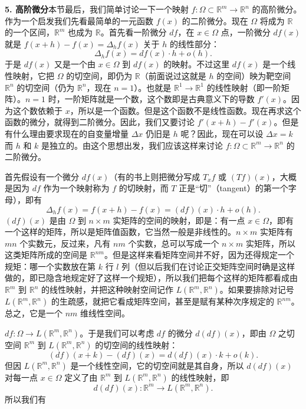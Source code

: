 \noindent\textbf{5. 高阶微分}\quad 本节最后，我们简单讨论一下一个映射 $f:\Omega\subset\mathbb R^m\to\mathbb R^n$ 的高阶微分。作为一个启发我们先看最简单的一元函数 $f(x)$ 的二阶微分。现在 $\Omega$ 将成为 $\mathbb R$ 的一个区间，$\mathbb R^m$ 也成为 $\mathbb R$。首先看一阶微分 $df$，在 $x\in\Omega$ 点，一阶微分 $df(x)$ 就是 $f(x+h)-f(x)=\Delta_hf(x)$ 关于 $h$ 的线性部分：
\[
 \Delta_hf(x)=df(x)\cdot h+o(h).
\]
于是 $df(x)$ 又是一个由 $x\in\Omega$ 到 $df(x)$ 的映射。不过这里 $df(x)$ 是一个线性映射，它把 $\Omega$ 的切空间，即仍为 $\mathbb R$（前面说过这就是 $h$ 的空间）映为靶空间 $\mathbb R^n$ 的切空间（仍为 $\mathbb R^n$，现在 $n=1$）。也就是 $\mathbb R^1\to\mathbb R^1$ 的线性映射（即一阶矩阵）。$n=1$ 时，一阶矩阵就是一个数，这个数即是古典意义下的导数 $f'(x)$。因为这个数依赖于 $x$，所以是一个函数。但是这个函数不是线性函数。现在再求这个函数的微分，就得到二阶微分。因此，我们又要讨论 $f'(x+h)-f'(x)$。但是有什么理由要求现在的自变量增量 $\Delta x$ 仍旧是 $h$ 呢？因此，现在可以设 $\Delta x=k$ 而 $h$ 和 $k$ 是独立的。由这个思想出发，我们应该这样来讨论 $f:\Omega\subset\mathbb R^m\to\mathbb R^n$ 的二阶微分。

首先假设有一个微分 $df(x)$（有的书上则把微分写成 $T_xf$ 或 $(Tf)(x)$，大概是因为 $df$ 作为一个映射称为 $f$ 的切映射，而 $T$ 正是“切”（tangent）的第一个字母），即有
\[
 \Delta_hf(x)=f(x+h)-f(x)=(df)(x)\cdot h+o(h).
\]
$(df)(x)$ 是由 $\Omega$ 到 $n\times m$ 实矩阵的空间的映射，即是：有一点 $x\in\Omega$，即有一个这样的矩阵，所以是矩阵值函数，它当然一般是非线性的。$n\times m$ 实矩阵有 $mn$ 个实数元，反过来，凡有 $nm$ 个实数，总可以写成一个 $n\times m$ 实矩阵，所以这类矩阵所成的空间是 $\mathbb R^{nm}$。但是这样来看矩阵空间并不好，因为还得规定一个规矩：哪一个实数放在第 $k$ 行 $l$ 列（但以后我们在讨论正交矩阵空间时确是这样做的，即已隐含地规定好了这样一个规矩），所以我们把每个这样的矩阵都看成由 $\mathbb R^m$ 到 $\mathbb R^n$ 的线性映射，并把这种映射空间记作 $L(\mathbb R^m,\mathbb R^n)$。如果要排除对记号 $L(\mathbb R^m,\mathbb R^n)$ 的生疏感，就把它看成矩阵空间，甚至是赋有某种次序规定的 $\mathbb R^{nm}$。总之，它是一个 $nm$ 维线性空间。

$df:\Omega\to L(\mathbb R^m,\mathbb R^n)$。于是我们可以考虑 $df$ 的微分 $d(df)(x)$，即由 $\Omega$ 之切空间 $\mathbb R^m$ 到 $L(\mathbb R^m,\mathbb R^n)$ 的切空间的线性映射：
\[
 (df)(x+k)-(df)(x)=d(df)(x)\cdot k+o(k).
\]
但因 $L(\mathbb R^m,\mathbb R^n)$ 是一个线性空间，它的切空间就是其自身，所以 $d(df)(x)$ 对每一点 $x\in\Omega$ 定义了由 $\mathbb R^m$ 到 $L(\mathbb R^m,\mathbb R^n)$ 的线性映射，即
\[
 d(df)(x):\mathbb R^m\to L(\mathbb R^m,\mathbb R^n).
\]
所以我们有

